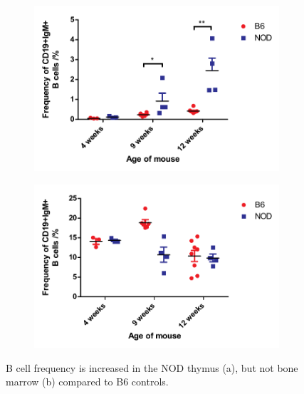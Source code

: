 \begin{figure}
	\begin{subfigure}{0.5\textwidth}
	\includegraphics[width=\textwidth]{Figures/IncthyBcells.pdf}
	\caption{}
	\label{subfig:IncthyBcells}
	\end{subfigure}
	\begin{subfigure}{0.5\textwidth}
	\includegraphics[width=\textwidth]{Figures/BMBcells.pdf}
	\caption{}
	\label{subfig:BMBcells}
	\end{subfigure}
\caption{B cell frequency is increased in the NOD thymus (a), but not bone marrow (b) compared to B6 controls.}
\label{fig:IncthyBcells}
\end{figure}

